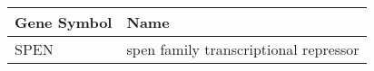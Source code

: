 \begin{tabular}{ll}
\toprule
Gene Symbol &                                  Name \\
\midrule
       SPEN & spen family transcriptional repressor \\
\bottomrule
\end{tabular}
